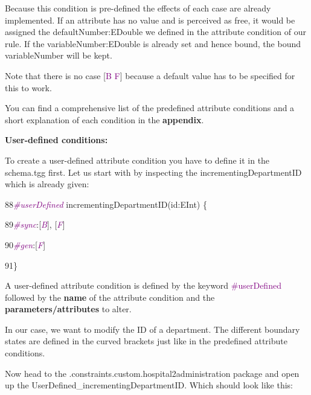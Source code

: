 Because this condition is pre-defined the effects of each case are already implemented. If an attribute has no value and is perceived as free, it would be assigned the \textsf{defaultNumber:EDouble} we defined in the attribute condition of our rule. If the \textsf{variableNumber:EDouble} is already set and hence bound, the bound variableNumber will be kept.

Note that there is no case [\textcolor{Purple}{B F}] because a default value has to be specified for this to work.\newline

You can find a comprehensive list of the predefined attribute conditions and a short explanation of each condition in the \textbf{appendix}.\newline

\textbf{User-defined conditions:}

To create a user-defined attribute condition you have to define it in the \textsf{schema.tgg} first. Let us start with by inspecting the \textsf{incrementingDepartmentID} which is already given:\newline

{

88\hspace{0.5cm}\textcolor{Purple}{\textit{\#userDefined}} incrementingDepartmentID(id:EInt) \{
	
89\hspace{1cm}\textcolor{Purple}{\textit{\#sync}}:\hspace{0.3cm}[\textcolor{Purple}{\textit{B}}], [\textcolor{Purple}{\textit{F}}]
		
90\hspace{1cm}\textcolor{Purple}{\textit{\#gen}}:\hspace{0.3cm}[\textcolor{Purple}{\textit{F}}]
		
91\hspace{0.5cm}\}\newline
}

A user-defined attribute condition is defined by the keyword \textcolor{Purple}{\#userDefined} followed by the \textbf{name} of the attribute condition and the \textbf{parameters/attributes} to alter.

In our case, we want to modify the ID of a department. The different boundary states are defined in the curved brackets just like in the predefined attribute conditions.

Now head to the \textsf{.constraints.custom.hospital2administration} package and open up the \textsf{UserDefined\_incrementingDepartmentID}. Which should look like this: \newline

